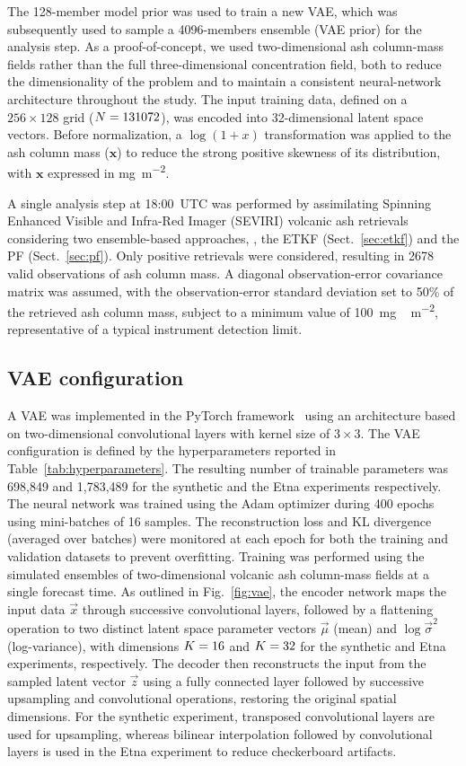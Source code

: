 %
%
The 128-member model prior was used to train a new VAE, which was subsequently used to sample a 4096-members ensemble (VAE prior) for the analysis step. As a proof-of-concept, we used two-dimensional ash column-mass fields rather than the full three-dimensional concentration field, both to reduce the dimensionality of the problem and to maintain a consistent neural-network architecture throughout the study. The input training data, defined on a $256 \times 128$ grid ($N=131072$), was encoded into 32-dimensional latent space vectors. Before normalization, a $\log(1+x)$ transformation was applied to the ash column mass ($\mathbf{x}$) to reduce the strong positive skewness of its distribution, with $\mathbf{x}$ expressed in \unit{mg~m^{-2}}.

%
%
A single analysis step at 18:00~UTC was performed by assimilating Spinning Enhanced Visible and Infra-Red Imager (SEVIRI) volcanic ash retrievals \citep{corradini2020,corradini2021} considering two ensemble-based approaches, \ie, the ETKF (Sect.~\ref{sec:etkf}) and the PF (Sect.~\ref{sec:pf}). Only positive retrievals were considered, resulting in 2678 valid observations of ash column mass. A diagonal observation-error covariance matrix was assumed, with the observation-error standard deviation set to 50\% of the retrieved ash column mass, subject to a minimum value of 100~\unit{mg\,m^{-2}}, representative of a typical instrument detection limit.
%
%
\subsection{VAE configuration}
\label{sec:VAE_configuration}
A VAE was implemented in the PyTorch framework~\citep{paszke2019} using an architecture based on two-dimensional convolutional layers with kernel size of $3\times 3$. The VAE configuration is defined by the hyperparameters reported in Table~\ref{tab:hyperparameters}. The resulting number of trainable parameters was 698,849 and 1,783,489 for the synthetic and the Etna experiments respectively. The neural network was trained using the Adam optimizer during 400 epochs using mini-batches of 16 samples. The reconstruction loss and KL divergence (averaged over batches) were monitored at each epoch for both the training and validation datasets to prevent overfitting. Training was performed using the simulated ensembles of two-dimensional volcanic ash column-mass fields at a single forecast time. As outlined in Fig.~\ref{fig:vae}, the encoder network maps the input data $\vec{x}$ through successive convolutional layers, followed by a flattening operation to two distinct latent space parameter vectors $\vec{\mu}$ (mean) and $\log\vec{\sigma}^2$ (log-variance), with dimensions $K=16$ and $K=32$ for the synthetic and Etna experiments, respectively. The decoder then reconstructs the input from the sampled latent vector $\vec{z}$ using a fully connected layer followed by successive upsampling and convolutional operations, restoring the original spatial dimensions. For the synthetic experiment, transposed convolutional layers are used for upsampling, whereas bilinear interpolation followed by convolutional layers is used in the Etna experiment to reduce checkerboard artifacts.


